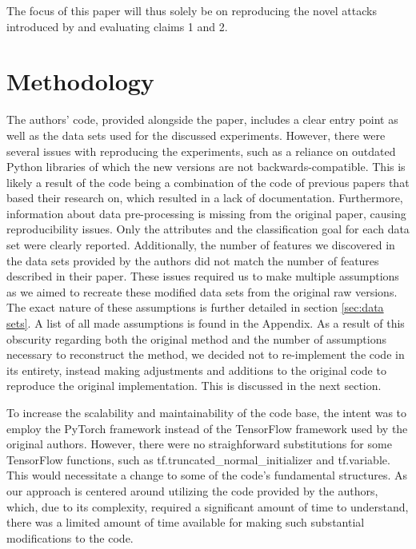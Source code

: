The focus of this paper will thus solely be on reproducing the novel attacks introduced by \cite{mehrabi2020exacerbating} and evaluating claims 1 and 2.

\section{Methodology}
\label{method}
The authors' code, provided alongside the paper, includes a clear entry point as well as the data sets used for the discussed experiments. However, there were several issues with reproducing the experiments, such as a reliance on outdated Python libraries of which the new versions are not backwards-compatible.
This is likely a result of the code being a combination of the code of previous papers that \cite{mehrabi2020exacerbating} based their research on, which resulted in a lack of documentation.
Furthermore, information about data pre-processing is missing from the original paper, causing reproducibility issues. Only the attributes and the classification goal for each data set were clearly reported. Additionally, the number of features we discovered in the data sets provided by the authors did not match the number of features described in their paper. These issues required us to make multiple assumptions as we aimed to recreate these modified data sets from the original raw versions. The exact nature of these assumptions is further detailed in section \ref{sec:data sets}. A list of all made assumptions is found in the Appendix.
As a result of this obscurity regarding both the original method and the number of assumptions necessary to reconstruct the method, we decided not to re-implement the code in its entirety, instead making adjustments and additions to the original code to reproduce the original implementation. This is discussed in the next section. 

To increase the scalability and maintainability of the code base, the intent was to employ the PyTorch framework instead of the TensorFlow framework used by the original authors.
However, there were no straighforward substitutions for some TensorFlow functions, such as tf.truncated\_normal\_initializer and tf.variable. 
This would necessitate a change to some of the code's fundamental structures. As our approach is centered around utilizing the code provided by the authors, which, due to its complexity, required a significant amount of time to understand, there was a limited amount of time available for making such substantial modifications to the code. 


